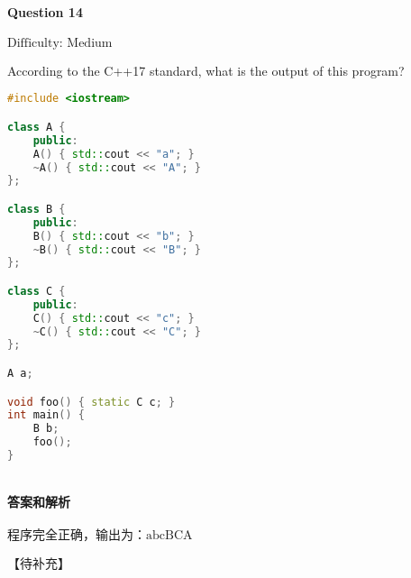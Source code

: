 \documentclass{article}
\begin{document}
	\paragraph*{Question 14} $\boxed{\text{Difficulty: Medium}} $			
	
	According to the C++17 standard, what is the output of this program?
	
	\begin{lstlisting}[language=C++]  		
#include <iostream>

class A {
	public:
	A() { std::cout << "a"; }
	~A() { std::cout << "A"; }
};

class B {
	public:
	B() { std::cout << "b"; }
	~B() { std::cout << "B"; }
};

class C {
	public:
	C() { std::cout << "c"; }
	~C() { std::cout << "C"; }
};

A a;

void foo() { static C c; }
int main() {
	B b;
	foo();
}
		
	\end{lstlisting}
	
	\paragraph*{答案和解析} $\boxed{\text{程序完全正确，输出为：abcBCA}} $
	
	【待补充】
	
\end{document}
